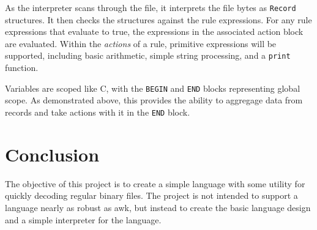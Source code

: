\documentclass[letterpaper,11pt]{article}
\begin{document}
As the interpreter scans through the file, it interprets the file bytes as \texttt{Record} structures.  It then checks the structures against the rule expressions.  For any rule expressions that evaluate to true, the expressions in the associated action block are evaluated.  Within the \textsl{actions} of a rule, primitive expressions will be supported, including basic arithmetic, simple string processing, and a \texttt{print} function.

Variables are scoped like C, with the \texttt{BEGIN} and \texttt{END} blocks representing global scope.  As demonstrated above, this provides the ability to aggregage data from records and take actions with it in the \texttt{END} block.

\section{Conclusion}
The objective of this project is to create a simple language with some utility for quickly decoding regular binary files.  The project is not intended to support a language nearly as robust as awk, but instead to create the basic language design and a simple interpreter for the language.
\end{document}

